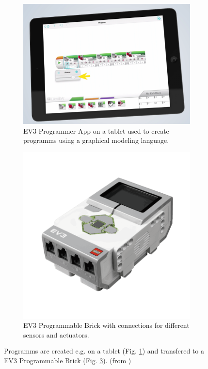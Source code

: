\documentclass[runningheads,a4paper]{llncs}
\begin{document}
\begin{figure}[H]
	  \centering
	  \begin{subfigure}[t]{0.45\textwidth}\centering\includegraphics[width=.9\columnwidth]{images/mindstorms0.PNG}
	  \caption{EV3 Programmer App on a tablet used to create programms using a graphical modeling language. }\label{fig:ev3app}\end{subfigure}\hspace*{\fill}
	  \begin{subfigure}[t]{0.45\textwidth}\centering\includegraphics[width=.9\columnwidth]{images/ev3brick.png}
	  \caption{EV3 Programmable Brick with connections for different sensors and actuators. }  \label{fig:ev3pbrick}\end{subfigure}
	  \caption{ Programms are created e.g. on a tablet (Fig. \ref{fig:ev3app}) and transfered to a EV3 Programmable Brick (Fig. \ref{fig:ev3pbrick}). (from \cite{legoev3})}
\end{figure}
\end{document}
